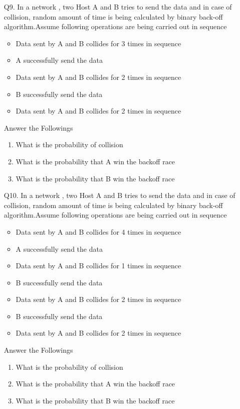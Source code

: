 \documentclass[a4paper,11pt]{article}
\begin{document}
\begin{enumerate}
\item[Q9.]
In a network , two Host A and B tries to send the data and in case of collision, random amount of time is being calculated by binary back-off algorithm.Assume following operations are being carried out in sequence
\begin{itemize}
  \item  Data sent by A and B collides for 3 times in sequence
  \item A successfully send the data
  \item Data sent by A and B collides for 2 times in sequence
  \item B successfully send the data
  \item Data sent by A and B collides for 2 times in sequence
\end{itemize}
Answer the Followings
\begin{enumerate}
  \item What is the probability of collision
  \item What is the probability that A win the backoff race
  \item What is the probability that B win the backoff race
\end{enumerate}

\item[Q10.]
In a network , two Host A and B tries to send the data and in case of collision, random amount of time is being calculated by binary back-off algorithm.Assume following operations are being carried out in sequence
\begin{itemize}
  \item  Data sent by A and B collides for 4 times in sequence
  \item A successfully send the data
  \item  Data sent by A and B collides for 1 times in sequence
  \item B successfully send the data
  \item Data sent by A and B collides for 2 times in sequence
  \item B successfully send the data
  \item Data sent by A and B collides for 2 times in sequence
\end{itemize}
Answer the Followings
\begin{enumerate}
  \item What is the probability of collision
  \item What is the probability that A win the backoff race
  \item What is the probability that B win the backoff race
\end{enumerate}


\end{enumerate}
\end{document}
